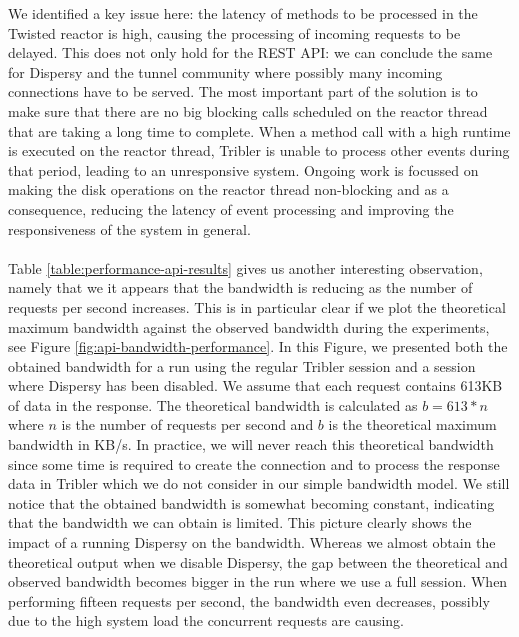 We identified a key issue here: the latency of methods to be processed in the Twisted reactor is high, causing the processing of incoming requests to be delayed. This does not only hold for the REST API: we can conclude the same for Dispersy and the tunnel community where possibly many incoming connections have to be served. The most important part of the solution is to make sure that there are no big blocking calls scheduled on the reactor thread that are taking a long time to complete. When a method call with a high runtime is executed on the reactor thread, Tribler is unable to process other events during that period, leading to an unresponsive system. Ongoing work is focussed on making the disk operations on the reactor thread non-blocking and as a consequence, reducing the latency of event processing and improving the responsiveness of the system in general.\\\\
Table \ref{table:performance-api-results} gives us another interesting observation, namely that we it appears that the bandwidth is reducing as the number of requests per second increases. This is in particular clear if we plot the theoretical maximum bandwidth against the observed bandwidth during the experiments, see Figure \ref{fig:api-bandwidth-performance}. In this Figure, we presented both the obtained bandwidth for a run using the regular Tribler session and a session where Dispersy has been disabled. We assume that each request contains 613KB of data in the response. The theoretical bandwidth is calculated as $ b = 613* n $ where $ n $ is the number of requests per second and $ b $ is the theoretical maximum bandwidth in KB/s. In practice, we will never reach this theoretical bandwidth since some time is required to create the connection and to process the response data in Tribler which we do not consider in our simple bandwidth model. We still notice that the obtained bandwidth is somewhat becoming constant, indicating that the bandwidth we can obtain is limited. This picture clearly shows the impact of a running Dispersy on the bandwidth. Whereas we almost obtain the theoretical output when we disable Dispersy, the gap between the theoretical and observed bandwidth becomes bigger in the run where we use a full session. When performing fifteen requests per second, the bandwidth even decreases, possibly due to the high system load the concurrent requests are causing.

